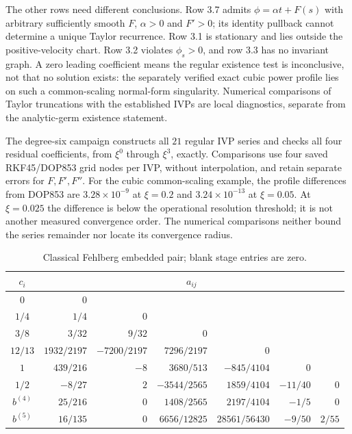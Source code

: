 \documentclass[11pt]{article}
\theoremstyle{definition}
\begin{document}
The other rows need different conclusions. Row 3.7 admits
$\phi=\alpha t+F(s)$ with arbitrary sufficiently smooth $F$, $\alpha>0$
and $F'>0$; its identity pullback cannot determine a unique Taylor
recurrence. Row 3.1 is stationary and lies outside the positive-velocity
chart. Row 3.2 violates $\phi_s>0$, and row 3.3 has no invariant graph.
A zero leading coefficient means the regular existence test is inconclusive,
not that no solution exists: the separately verified exact cubic power
profile lies on such a common-scaling normal-form singularity. Numerical
comparisons of Taylor truncations with the established IVPs are local
diagnostics, separate from the analytic-germ existence statement.

The degree-six campaign constructs all $21$ regular IVP series and checks
all four residual coefficients, from $\xi^0$ through $\xi^3$, exactly.
Comparisons use four saved RKF45/DOP853 grid nodes per IVP, without
interpolation, and retain separate errors for $F,F',F''$. For the cubic
common-scaling example, the profile differences from DOP853 are
$3.28\times10^{-9}$ at $\xi=0.2$ and $3.24\times10^{-13}$ at $\xi=0.05$.
At $\xi=0.025$ the difference is below the operational resolution threshold;
it is not another measured convergence order. The numerical comparisons
neither bound the series remainder nor locate its convergence radius.


\begin{table}[htbp]
\centering\small
\begin{tabular}{@{}c|rrrrrr@{}}
\toprule
$c_i$ & \multicolumn{6}{c}{$a_{ij}$}\\
\midrule
$0$ & $0$ & & & & &\\
$1/4$ & $1/4$ & $0$ & & & &\\
$3/8$ & $3/32$ & $9/32$ & $0$ & & &\\
$12/13$ & $1932/2197$ & $-7200/2197$ & $7296/2197$ & $0$ & &\\
$1$ & $439/216$ & $-8$ & $3680/513$ & $-845/4104$ & $0$ &\\
$1/2$ & $-8/27$ & $2$ & $-3544/2565$ & $1859/4104$ & $-11/40$ & $0$\\
\midrule
$b^{(4)}$ & $25/216$ & $0$ & $1408/2565$ & $2197/4104$ & $-1/5$ & $0$\\
$b^{(5)}$ & $16/135$ & $0$ & $6656/12825$ & $28561/56430$ & $-9/50$ & $2/55$\\
\bottomrule
\end{tabular}
\caption{Classical Fehlberg embedded pair; blank stage entries are zero.}
\label{tab:sve-rkf-tableau}
\end{table}
\end{document}

